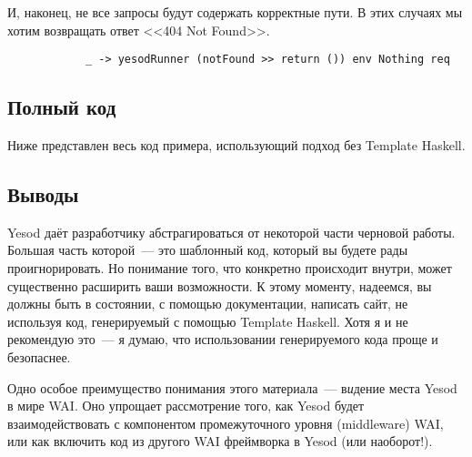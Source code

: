 И, наконец, не все запросы будут содержать корректные пути. В этих случаях мы
хотим возвращать ответ <<404 Not Found>>.
\begin{lstlisting}
            _ -> yesodRunner (notFound >> return ()) env Nothing req
\end{lstlisting}
            
\subsection{Полный код}
Ниже представлен весь код примера, использующий подход без Template Haskell.


\subsection{Выводы}
Yesod даёт разработчику абстрагироваться от некоторой части черновой работы.
Большая часть которой~--- это шаблонный код, который вы будете рады
проигнорировать. Но понимание того, что конкретно происходит внутри, может
существенно расширить ваши возможности. К этому моменту, надеемся, вы должны
быть в состоянии, с помощью документации, написать сайт, не используя код,
генерируемый с помощью Template Haskell. Хотя я и не рекомендую это~--- я
думаю, что использовании генерируемого кода проще и безопаснее.

Одно особое преимущество понимания этого материала~--- в\emph{и}дение места
Yesod в мире WAI. Оно упрощает рассмотрение того, как Yesod будет
взаимодействовать с компонентом промежуточного уровня (middleware) WAI, или как
включить код из другого WAI фреймворка в Yesod (или наоборот!).
